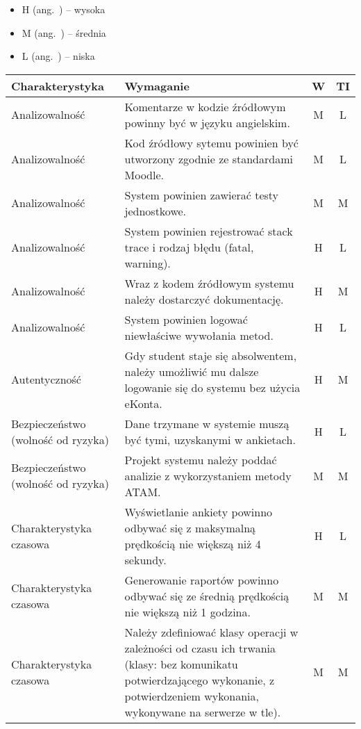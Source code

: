 \begin{itemize}
\item{H (ang.~) -- wysoka}
\item{M (ang.~) -- średnia}
\item{L (ang.~) -- niska}
\end{itemize}

\newpage
\begin{center}
\begin{longtable}{ | p{4cm} | p{9cm} | c | c | }
\hline
\textbf{Charakterystyka} & \textbf{Wymaganie} & \textbf{W} & \textbf{TI} \\ \hline
%
Analizowalność & Komentarze w kodzie źródłowym powinny być w języku angielskim. & M & L \\ \hline
Analizowalność & Kod źródłowy sytemu powinien być utworzony zgodnie ze standardami Moodle. & M & L \\ \hline
Analizowalność & System powinien zawierać testy jednostkowe. & M & M \\ \hline
Analizowalność & System powinien rejestrować stack trace i rodzaj błędu (fatal, warning). & H & L \\ \hline
Analizowalność & Wraz z kodem źródłowym systemu należy dostarczyć dokumentację. & H & M \\ \hline
Analizowalność & System powinien logować niewłaściwe wywołania metod. & H & L \\ \hline
%
Autentyczność & Gdy student staje się absolwentem, należy umożliwić mu dalsze logowanie się do systemu bez użycia eKonta. & H & M \\ \hline
%
Bezpieczeństwo (wolność od ryzyka) & Dane trzymane w systemie muszą być tymi, uzyskanymi w ankietach. & H & L \\ \hline
Bezpieczeństwo (wolność od ryzyka) & Projekt systemu należy poddać analizie z wykorzystaniem metody ATAM. & M & M \\ \hline
%
Charakterystyka czasowa & Wyświetlanie ankiety powinno odbywać się z maksymalną prędkością nie większą niż 4 sekundy. & H & L \\ \hline %
Charakterystyka czasowa & Generowanie raportów powinno odbywać się ze średnią prędkością nie większą niż 1 godzina. & M & M \\ \hline %
Charakterystyka czasowa & Należy zdefiniować klasy operacji w zależności od czasu ich trwania (klasy: bez komunikatu potwierdzającego wykonanie, z potwierdzeniem wykonania, wykonywane na serwerze w tle). & M & M \\ \hline

\end{longtable}
\end{center}
